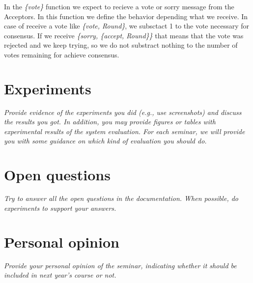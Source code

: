 \documentclass[a4paper, 10pt]{article}
\begin{document}
In the \textit{\{vote\}} function we expect to recieve a vote or sorry message from the Acceptors. In this function we define the behavior depending what we receive. In case of receive a vote like \textit{\{vote, Round\}}, we subsctact 1 to the vote necessary for consensus. If we receive \textit{\{sorry, \{accept, Round\}\}} that means that the vote was rejected and we keep trying, so we do not substract nothing to the number of votes remaining for achieve consensus.


\section{Experiments}

\textit{Provide evidence of the experiments you did (e.g., use screenshots) and discuss the results you got. In addition, you may provide figures or tables with experimental results of the system evaluation. For each seminar, we will provide you with some guidance on which kind of evaluation you should do.}

\section{Open questions}

\textit{Try to answer all the open questions in the documentation. When possible, do experiments to support your answers.}

\section{Personal opinion}

\textit{Provide your personal opinion of the seminar, indicating whether it should be included in next year's course or not.}
\end{document}
